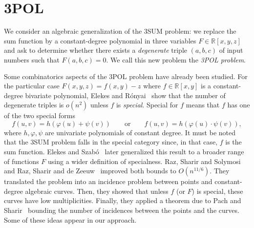 \section{3POL}\label{sec:problem:3pol}


We consider an algebraic generalization of the 3SUM problem: we replace the sum
function by a constant-degree polynomial in three variables $F \in
\mathbb{R}[x,y,z]$ and ask to determine whether there exists a
\emph{degenerate} triple $(a,b,c)$ of input numbers such that $F(a,b,c)=0$. We
call this new problem the \emph{3POL problem}.



Some combinatorics aspects of the 3POL problem have already been studied.
%
For the particular case $F(x,y,z) = f(x,y) - z$ where $f \in \mathbb{R}[x,y]$
is a constant-degree bivariate polynomial, Elekes and Rónyai~\cite{ER00} show
that the number of degenerate triples is $o(n^2)$ unless $f$ is
\emph{special}. Special for $f$ means that $f$ has one of the two special forms
\begin{displaymath}
f(u,v)=h(\varphi(u)+\psi(v))
\qquad
\text{or}
\qquad
f(u,v)=h(\varphi(u)\cdot\psi(v)),
\end{displaymath}
where $h,\varphi,\psi$ are univariate polynomials of constant degree.
It must be noted that the 3SUM problem falls in the special category since, in
that case, \( f \) is the sum function.
%
Elekes and Szabó~\cite{ES12} later generalized this result to a broader range
of functions $F$ using a wider definition of specialness.
%
Raz, Sharir and Solymosi~\cite{RSS14} and Raz, Sharir and de Zeeuw~\cite{RSZ15}
improved both bounds to $O(n^{11/6})$.
%
They translated the problem into an incidence problem between points and
constant-degree algebraic curves. Then, they showed that unless $f$ (or $F$) is
special, these curves have low multiplicities. Finally, they applied a theorem
due to Pach and Sharir~\cite{PS98} bounding the number of incidences between
the points and the curves. Some of these ideas appear in our approach.


